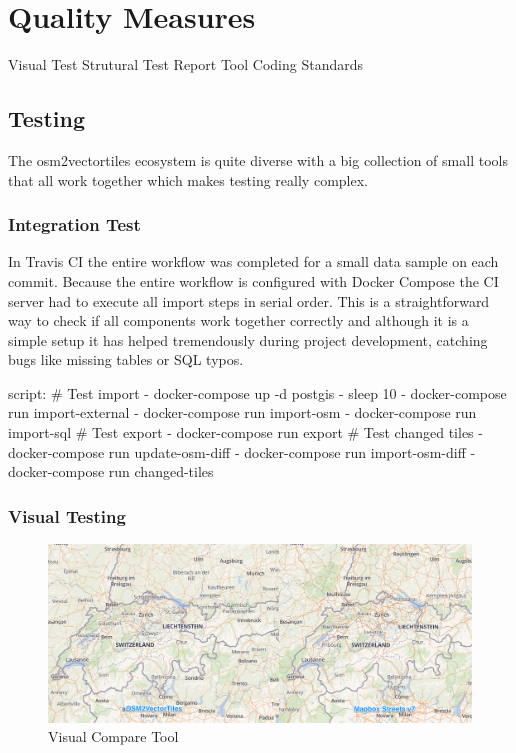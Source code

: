 \chapter{Quality Measures}\label{quality-measures}

Visual Test
Strutural Test
Report Tool
Coding Standards

\section{Testing}\label{testing}

The osm2vectortiles ecosystem is quite diverse with a big collection of small tools that all work together which makes testing really complex.

\subsection{Integration Test}

In Travis CI\cite{pm_5_travis-ci.org_2015}  the entire workflow was completed for a small data sample on each commit.
Because the entire workflow is configured with Docker Compose \cite{pm_6_docs.docker.com_2015} the CI server had to execute all import steps in serial order. This is a straightforward way to check if all components work together correctly
and although it is a simple setup it has helped tremendously during project development, catching bugs
like missing tables or SQL typos.

\begin{yamlcode}
script:
  # Test import
  - docker-compose up -d postgis
  - sleep 10
  - docker-compose run import-external
  - docker-compose run import-osm
  - docker-compose run import-sql
  # Test export
  - docker-compose run export
  # Test changed tiles
  - docker-compose run update-osm-diff
  - docker-compose run import-osm-diff
  - docker-compose run changed-tiles
\end{yamlcode}

\subsection{Visual Testing}

\begin{figure}[H]
  \centering
  \includegraphics[width=1.0\textwidth]{images/visual_compare}
  \caption{Visual Compare Tool}
  \label{visual_compare} 
\end{figure}

